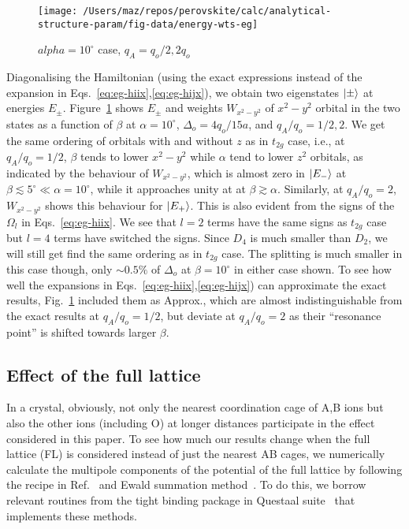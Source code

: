 \documentclass[a4paper,prb,twocolumn]{revtex4-1}  %
\begin{document}
\begin{figure}[htbp]
\begin{center}
\texttt{[image: /Users/maz/repos/perovskite/calc/analytical-structure-param/fig-data/energy-wts-eg]}
\caption{$alpha=10^\circ$ case, $q_A=q_o/2,2q_o$}
\label{fig:e-wts-eg}
\end{center}
\end{figure}

Diagonalising the Hamiltonian 
(using the exact expressions instead 
of the expansion in Eqs.~\ref{eq:eg-hiix},\ref{eq:eg-hijx}),
we obtain two eigenstates $\ket{\pm}$
at energies $E_{\pm}$.
Figure~\ref{fig:e-wts-eg}
shows $E_{\pm}$ and weights $W_{x^2-y^2}$ of $x^2-y^2$ orbital
in the two states
as a function of $\beta$
at $\alpha=10^\circ$, $\Delta_o=4q_o/15a$,
and 
$q_A/q_o=1/2,2$.
We get the same ordering of orbitals with and without $z$ as in $t_{2g}$ case,
i.e.,
at $q_A/q_o=1/2$,
$\beta$ tends to lower
$x^2-y^2$ while $\alpha$ tend to lower $z^2$ orbitals,
as indicated by the behaviour of $W_{x^2-y^2}$,
which is almost zero in $\ket{E_{-}}$ at $\beta\lesssim 5^\circ \ll \alpha=10^\circ$,
while it approaches unity at 
at $\beta\gtrsim \alpha$.
Similarly, at $q_A/q_o=2$,
$W_{x^2-y^2}$ shows this behaviour for $\ket{E_{+}}$.
This is also evident from the signs of the $\Omega_l$
in Eqs.~\ref{eq:eg-hiix}.
We see that $l=2$ terms have the same signs as $t_{2g}$ case but 
$l=4$ terms have switched the signs. 
Since $D_4$ is much smaller than $D_2$,
we will still get find the same ordering as in $t_{2g}$ case.
The splitting is much smaller in this case though, only $\sim 0.5\%$ of $\Delta_o$
at $\beta=10^\circ$ in either case shown.
To see how well
the expansions in Eqs.~\ref{eq:eg-hiix},\ref{eq:eg-hijx})
can approximate the exact results,
Fig.~\ref{fig:e-wts-eg} included
them as Approx., which are almost indistinguishable from the exact results
at $q_A/q_o=1/2$, but deviate at $q_A/q_o=2$ as their
``resonance point'' is shifted towards larger $\beta$.



\subsection{Effect of the full lattice}
\label{sec:FL}

In a crystal, obviously, not only the nearest coordination cage of A,B ions but also
 the other ions (including O) at longer distances
  participate in the effect considered in this paper.
To see how much our results change when 
 the full lattice (FL) is considered instead of just the nearest AB cages,
we numerically calculate the multipole components of the potential
 of the full lattice by following the recipe in Ref.~\cite{FinnisPRL98,PaxtonPRB08,PaxtonNotes}
and Ewald summation method~\cite{Ewald1921}.
To do this, 
we borrow relevant routines from the tight binding package in Questaal suite~\cite{Questaal} that implements these methods.
\end{document}
